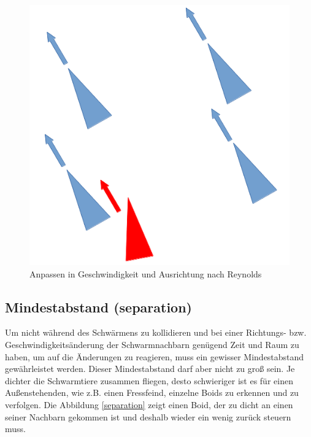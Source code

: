 \documentclass[draft=false
              ,paper=a4
              ,twoside=false
              ,fontsize=11pt
              ,headsepline
              ,BCOR10mm
              ,DIV11
              ,bibtotoc
              ,liststotoc
              ]{scrbook}
\begin{document}
\begin{figure}[!h]
\centering
\includegraphics[scale=0.4]{project/alignment.png}
\caption{Anpassen in Geschwindigkeit und Ausrichtung nach Reynolds \cite{reynolds87}}
\label{alignment}
\end{figure}

\subsection{Mindestabstand (separation)}
Um nicht während des Schwärmens zu kollidieren und bei einer Richtungs- bzw. Geschwindigkeitsänderung der Schwarmnachbarn genügend Zeit und Raum zu haben, um auf die Änderungen zu reagieren, muss ein gewisser Mindestabstand gewährleistet werden. Dieser Mindestabstand darf aber nicht zu groß sein. Je dichter die Schwarmtiere zusammen fliegen, desto schwieriger ist es für einen Außenstehenden, wie z.B. einen Fressfeind, einzelne Boids zu erkennen und zu verfolgen. Die Abbildung \ref{separation} zeigt einen Boid, der zu dicht an einen seiner Nachbarn gekommen ist und deshalb wieder ein wenig zurück steuern muss.
\end{document}
